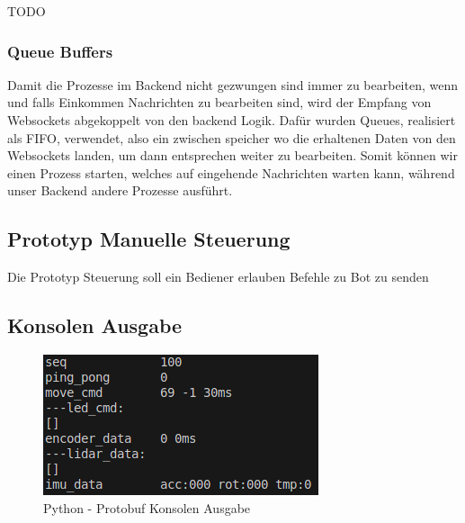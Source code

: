 TODO

\subsubsection{Queue Buffers}
Damit die Prozesse im Backend nicht gezwungen sind immer zu bearbeiten, 
wenn und falls Einkommen Nachrichten zu bearbeiten sind, 
wird der Empfang von Websockets abgekoppelt von den backend Logik.
Dafür wurden Queues, realisiert als FIFO, verwendet, also ein zwischen speicher 
wo die erhaltenen Daten von den Websockets landen, um dann entsprechen weiter zu bearbeiten.
Somit können wir einen Prozess starten, welches auf eingehende Nachrichten warten kann, 
während unser Backend andere Prozesse ausführt.

\subsection{Prototyp Manuelle Steuerung}
Die Prototyp Steuerung soll ein Bediener erlauben Befehle zu Bot zu senden

\subsection{Konsolen Ausgabe}
\begin{figure}[H]
    \includegraphics[width=\textwidth, center]{img/Backend/print_wrapper_all.png}
    \caption{Python - Protobuf Konsolen Ausgabe}
    \label{fig:py_konsole_o}
\end{figure}

